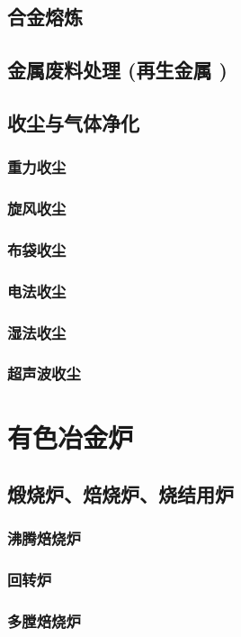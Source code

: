 \documentclass[UTF8]{../../ApplicationUniverse}
\begin{document}
    \subsection{合金熔炼}
    \subsection{金属废料处理 (再生金属 )}
    \subsection{收尘与气体净化}
        \subsubsection{重力收尘}
        \subsubsection{旋风收尘}
        \subsubsection{布袋收尘}
        \subsubsection{电法收尘}
        \subsubsection{湿法收尘}
        \subsubsection{超声波收尘}
\section{有色冶金炉}
    \subsection{煅烧炉、焙烧炉、烧结用炉}
        \subsubsection{沸腾焙烧炉}
        \subsubsection{回转炉}
        \subsubsection{多膛焙烧炉}
\end{document}
